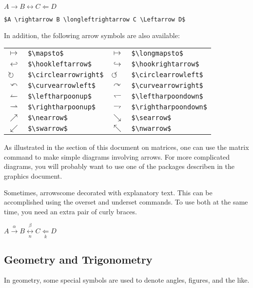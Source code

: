 $A \rightarrow B \longleftrightarrow C \Leftarrow D$

\smallskip

\verb"$A \rightarrow B \longleftrightarrow C \Leftarrow D$"

\bigskip

In addition, the following arrow symbols are also available:

\medskip

\begin{tabular}{l l l l}
$\mapsto$ & \verb"$\mapsto$" &
$\longmapsto$ & \verb"$\longmapsto$" \\
$\hookleftarrow$ & \verb"$\hookleftarrow$" &
$\hookrightarrow$ & \verb"$\hookrightarrow$" \\
$\circlearrowright$ & \verb"$\circlearrowright$" &
$\circlearrowleft$ & \verb"$\circlearrowleft$" \\
$\curvearrowleft$ & \verb"$\curvearrowleft$"  &
$\curvearrowright$ & \verb"$\curvearrowright$" \\
$\leftharpoonup$ & \verb"$\leftharpoonup$" &
$\leftharpoondown$ & \verb"$\leftharpoondown$"  \\
$\rightharpoonup$ & \verb"$\rightharpoonup$" &
$\rightharpoondown$ & \verb"$\rightharpoondown$"  \\
$\nearrow$ & \verb"$\nearrow$" &
$\searrow$ & \verb"$\searrow$" \\
$\swarrow$ & \verb"$\swarrow$" &
$\nwarrow$ & \verb"$\nwarrow$"
\end{tabular}

\bigskip

As illustrated in the section of this document on matrices, one can use the matrix command to make simple diagrams involving arrows.  For more complicated diagrams, you will probably want to use one of the packages describen in the graphics document.

Sometimes, arrowscome decorated with explanatory text.  This can be accomplished using the overset and underset commands.  To use both at the same time, you need an extra pair of curly braces.

\medskip

$A \overset{\alpha}\rightarrow B \overset{\beta}{\underset{n}\longleftrightarrow} C \underset{k}\Leftarrow D$

\subsection{Geometry and Trigonometry}

In geometry, some special symbols are used to denote angles, figures, and the like.

